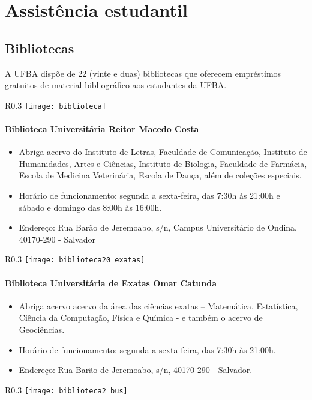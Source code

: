 \chapter{Assistência estudantil}
\DoPToC
\section{Bibliotecas}
    A UFBA dispõe de 22 (vinte e duas) bibliotecas que oferecem empréstimos gratuitos de material bibliográfico aos estudantes da UFBA.
    \begin{wrapfigure}{R}{0.3\textwidth}
            \centering
            \texttt{[image: biblioteca]}
        \end{wrapfigure}
    \subsubsection{Biblioteca Universitária Reitor Macedo Costa}
        \begin{itemize}
            \item Abriga acervo do Instituto de Letras, Faculdade de Comunicação, Instituto de Humanidades, Artes e Ciências, Instituto de Biologia, Faculdade de Farmácia, Escola de Medicina Veterinária, Escola de Dança, além de coleções especiais.
            \item Horário de funcionamento: segunda a sexta-feira, das 7:30h às 21:00h e sábado e domingo das 8:00h às 16:00h.
            \item Endereço: Rua Barão de Jeremoabo, s/n, Campus Universitário de Ondina, 40170-290 - Salvador
        \end{itemize}
        
        \newpage
\begin{wrapfigure}{R}{0.3\textwidth}
    \centering
    \texttt{[image: biblioteca20\_exatas]}
\end{wrapfigure}
    \subsubsection{Biblioteca Universitária de Exatas Omar Catunda}
        \begin{itemize}
            \item Abriga acervo acervo da área das ciências exatas – Matemática, Estatística, Ciência da Computação, Física e Química - e também o acervo de Geociências.
            \item Horário de funcionamento: segunda a sexta-feira, das 7:30h às 21:00h.
            \item Endereço: Rua Barão de Jeremoabo, s/n, 40170-290 - Salvador.
        \end{itemize}
    \begin{wrapfigure}{R}{0.3\textwidth}
            \centering
            \texttt{[image: biblioteca2\_bus]}
    \end{wrapfigure}
